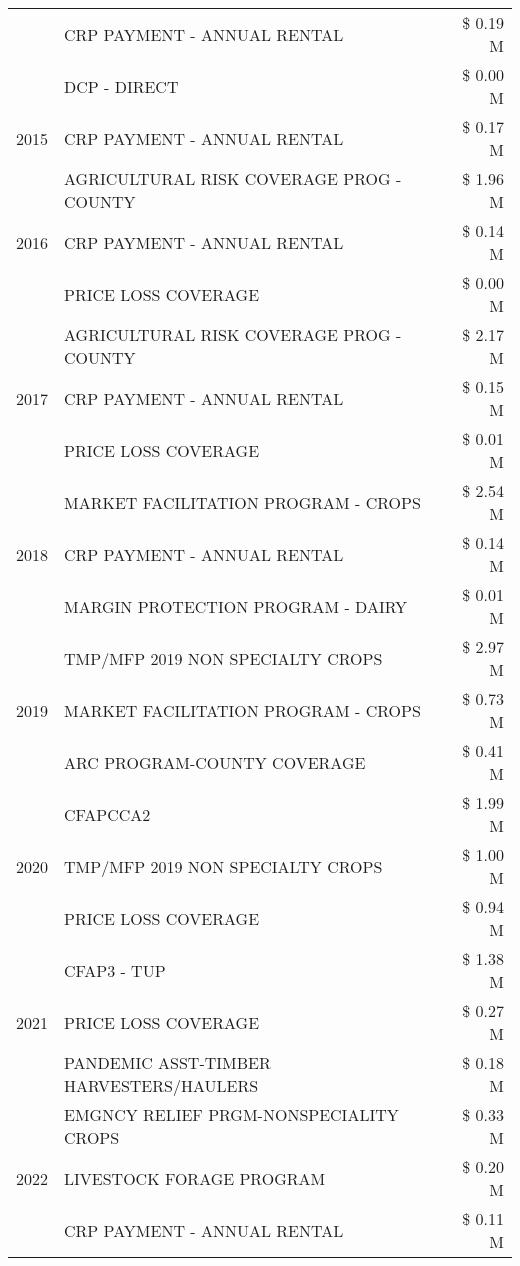 \begin{tabular}{llr}
 & CRP PAYMENT - ANNUAL RENTAL & \$ 0.19 M \\
 & DCP - DIRECT & \$ 0.00 M \\
\cline{1-3}
2015 & CRP PAYMENT - ANNUAL RENTAL & \$ 0.17 M \\
\cline{1-3}
\multirow[t]{3}{*}{2016} & AGRICULTURAL RISK COVERAGE PROG - COUNTY & \$ 1.96 M \\
 & CRP PAYMENT - ANNUAL RENTAL & \$ 0.14 M \\
 & PRICE LOSS COVERAGE & \$ 0.00 M \\
\cline{1-3}
\multirow[t]{3}{*}{2017} & AGRICULTURAL RISK COVERAGE PROG - COUNTY & \$ 2.17 M \\
 & CRP PAYMENT - ANNUAL RENTAL & \$ 0.15 M \\
 & PRICE LOSS COVERAGE & \$ 0.01 M \\
\cline{1-3}
\multirow[t]{3}{*}{2018} & MARKET FACILITATION PROGRAM - CROPS & \$ 2.54 M \\
 & CRP PAYMENT - ANNUAL RENTAL & \$ 0.14 M \\
 & MARGIN PROTECTION PROGRAM - DAIRY & \$ 0.01 M \\
\cline{1-3}
\multirow[t]{3}{*}{2019} & TMP/MFP 2019 NON SPECIALTY CROPS & \$ 2.97 M \\
 & MARKET FACILITATION PROGRAM - CROPS & \$ 0.73 M \\
 & ARC PROGRAM-COUNTY COVERAGE & \$ 0.41 M \\
\cline{1-3}
\multirow[t]{3}{*}{2020} & CFAPCCA2 & \$ 1.99 M \\
 & TMP/MFP 2019 NON SPECIALTY CROPS & \$ 1.00 M \\
 & PRICE LOSS COVERAGE & \$ 0.94 M \\
\cline{1-3}
\multirow[t]{3}{*}{2021} & CFAP3 - TUP & \$ 1.38 M \\
 & PRICE LOSS COVERAGE & \$ 0.27 M \\
 & PANDEMIC ASST-TIMBER HARVESTERS/HAULERS & \$ 0.18 M \\
\cline{1-3}
\multirow[t]{3}{*}{2022} & EMGNCY RELIEF PRGM-NONSPECIALITY CROPS & \$ 0.33 M \\
 & LIVESTOCK FORAGE PROGRAM & \$ 0.20 M \\
 & CRP PAYMENT - ANNUAL RENTAL & \$ 0.11 M \\
\cline{1-3}
\bottomrule
\end{tabular}
